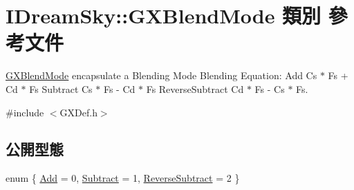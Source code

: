 \hypertarget{class_i_dream_sky_1_1_g_x_blend_mode}{}\section{I\+Dream\+Sky\+:\+:G\+X\+Blend\+Mode 類別 參考文件}
\label{class_i_dream_sky_1_1_g_x_blend_mode}


\hyperlink{class_i_dream_sky_1_1_g_x_blend_mode}{G\+X\+Blend\+Mode} encapsulate a Blending Mode Blending Equation\+: Add Cs $\ast$ Fs + Cd $\ast$ Fs Subtract Cs $\ast$ Fs -\/ Cd $\ast$ Fs Reverse\+Subtract Cd $\ast$ Fs -\/ Cs $\ast$ Fs.  




{\ttfamily \#include $<$G\+X\+Def.\+h$>$}

\subsection*{公開型態}
\begin{DoxyCompactItemize}
\item 
enum \{ \hyperlink{class_i_dream_sky_1_1_g_x_blend_mode_a682f70193e86e5f6fdcfe1bd2712cb53ad5210778b75eb7c9af10dfb33b5d8b68}{Add} = 0, 
\hyperlink{class_i_dream_sky_1_1_g_x_blend_mode_a682f70193e86e5f6fdcfe1bd2712cb53aef589545008c82e0b567c5522a09cdda}{Subtract} = 1, 
\hyperlink{class_i_dream_sky_1_1_g_x_blend_mode_a682f70193e86e5f6fdcfe1bd2712cb53aa8229ac90a7b08e7ac7714637a8b13aa}{Reverse\+Subtract} = 2
 \}
\end{DoxyCompactItemize}

